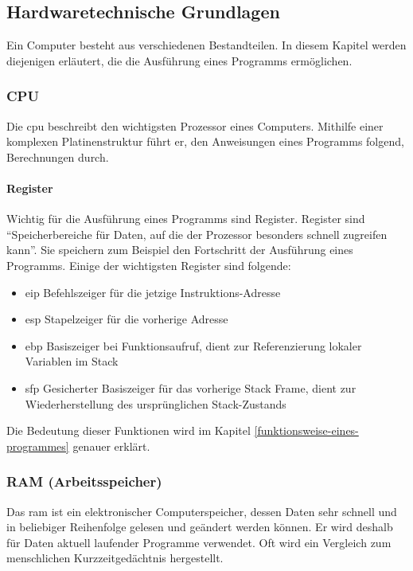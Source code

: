 \documentclass[11pt, a4paper]{article}
\begin{document}
\subsection{Hardwaretechnische Grundlagen}
Ein Computer besteht aus verschiedenen Bestandteilen. In diesem Kapitel werden diejenigen erläutert, die die Ausführung eines Programms ermöglichen.
\subsubsection{CPU}
Die \gls{cpu} beschreibt den wichtigsten Prozessor eines Computers. Mithilfe einer komplexen Platinenstruktur führt er, den Anweisungen eines Programms folgend, Berechnungen durch. 
\paragraph{Register}
Wichtig für die Ausführung eines Programms sind Register. Register sind ``Speicherbereiche für Daten, auf die der Prozessor besonders schnell zugreifen kann''. \cite{RegisterWikipedia:online} Sie speichern zum Beispiel den Fortschritt der Ausführung eines Programms. Einige der wichtigsten Register sind folgende:
\begin{itemize}
	\item \gls{eip} Befehlszeiger für die jetzige Instruktions-Adresse \cite{UsefulRe7:online}
	\item \gls{esp} Stapelzeiger für die vorherige Adresse \cite{UsefulRe7:online}
	\item \gls{ebp} Basiszeiger bei Funktionsaufruf, dient zur Referenzierung lokaler Variablen im Stack \cite{UsefulRe7:online}
	\item \gls{sfp} Gesicherter Basiszeiger für das vorherige Stack Frame, dient zur Wiederherstellung des ursprünglichen Stack-Zustands \cite{UsefulRe7:online}
\end{itemize}

Die Bedeutung dieser Funktionen wird im Kapitel \ref{funktionsweise-eines-programmes}  genauer erklärt.
\subsubsection{RAM (Arbeitsspeicher)}
Das \gls{ram} ist ein elektronischer Computerspeicher, dessen Daten sehr schnell und in beliebiger Reihenfolge gelesen und geändert werden können. Er wird deshalb für Daten aktuell laufender Programme verwendet. Oft wird ein Vergleich zum menschlichen Kurzzeitgedächtnis hergestellt. 
\end{document}
